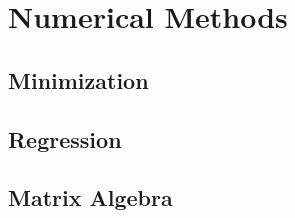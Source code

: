 \section{Numerical Methods}

\subsection{Minimization}

\subsection{Regression}

\subsection{Matrix Algebra}

